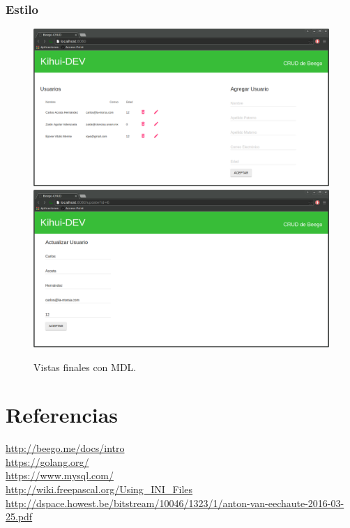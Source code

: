 \documentclass[12pt]{article}
\begin{document}
\subsubsection{Estilo}
\begin{figure}[H]
  \includegraphics[width=1\textwidth]{1}
  \includegraphics[width=1\textwidth]{2}
  \caption{Vistas finales con MDL.}
\end{figure}
\section{Referencias}
\noindent
\url{http://beego.me/docs/intro} \\
\url{https://golang.org/}\\
\url{https://www.mysql.com/} \\
\url{http://wiki.freepascal.org/Using_INI_Files} \\
\url{http://dspace.howest.be/bitstream/10046/1323/1/anton-van-eechaute-2016-03-25.pdf}
\end{document}
